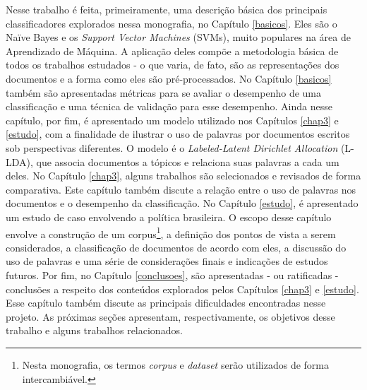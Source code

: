 Nesse trabalho é feita, primeiramente, uma descrição básica dos principais classificadores explorados nessa monografia, no Capítulo \ref{basicos}. Eles são o Naïve Bayes e os \emph{Support Vector Machines} (SVMs), muito populares na área de Aprendizado de Máquina. A aplicação deles compõe a metodologia básica de todos os trabalhos estudados - o que varia, de fato, são as representações dos documentos e a forma como eles são pré-processados. No Capítulo \ref{basicos} também são apresentadas métricas para se avaliar o desempenho de uma classificação e uma técnica de validação para esse desempenho. Ainda nesse capítulo, por fim, é apresentado um modelo utilizado nos Capítulos \ref{chap3} e \ref{estudo}, com a finalidade de ilustrar o uso de palavras por documentos escritos sob perspectivas diferentes. O modelo é o \emph{Labeled-Latent Dirichlet Allocation} (L-LDA), que associa documentos a tópicos e relaciona suas palavras a cada um deles. No Capítulo \ref{chap3}, alguns trabalhos são selecionados e revisados de forma comparativa. Este capítulo também discute a relação entre o uso de palavras nos documentos e o desempenho da classificação. No Capítulo \ref{estudo}, é apresentado um estudo de caso envolvendo a política brasileira. O escopo desse capítulo envolve a construção de um corpus\footnote{Nesta monografia, os termos \emph{corpus} e \emph{dataset} serão utilizados de forma intercambiável.}, a definição dos pontos de vista a serem considerados, a classificação de documentos de acordo com eles, a discussão do uso de palavras e uma série de considerações finais e indicações de estudos futuros. Por fim, no Capítulo \ref{conclusoes}, são apresentadas - ou ratificadas - conclusões a respeito dos conteúdos explorados pelos Capítulos \ref{chap3} e \ref{estudo}. Esse capítulo também discute as principais dificuldades encontradas nesse projeto. As próximas seções apresentam, respectivamente, os objetivos desse trabalho e alguns trabalhos relacionados.




   


